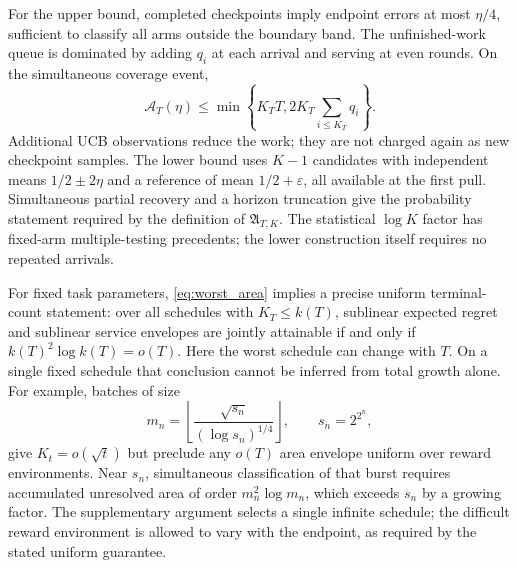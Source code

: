 For the upper bound, completed checkpoints imply endpoint errors at most
$\eta/4$, sufficient to classify all arms outside the boundary band. The
unfinished-work queue is dominated by adding $q_i$ at each arrival and serving
at even rounds. On the simultaneous coverage event,
\begin{equation}
 \mathcal A_T(\eta)\le\min\left\{K_TT,
                         2K_T\sum_{i\le K_T}q_i\right\}.
 \label{eq:queue_upper}
\end{equation}
Additional UCB observations reduce the work; they are not charged again as
new checkpoint samples. The lower bound uses $K-1$ candidates with independent
means $1/2\pm2\eta$ and a reference of mean $1/2+\varepsilon$, all available
at the first pull. Simultaneous partial recovery and a horizon truncation give
the probability statement required by the definition of $\mathfrak A_{T,K}$.
The statistical $\log K$ factor has fixed-arm multiple-testing precedents;
the lower construction itself requires no repeated arrivals.

For fixed task parameters, \eqref{eq:worst_area} implies a precise uniform
terminal-count statement: over all schedules with $K_T\le k(T)$, sublinear
expected regret and sublinear service envelopes are jointly attainable if and
only if $k(T)^2\log k(T)=o(T)$. Here the worst schedule can change with $T$.
On a single fixed schedule that conclusion cannot be inferred from total
growth alone. For example, batches of size
\[
 m_n=\left\lfloor\frac{\sqrt{s_n}}{(\log s_n)^{1/4}}\right\rfloor,
 \qquad s_n=2^{2^n},
\]
give $K_t=o(\sqrt t)$ but preclude any $o(T)$ area envelope uniform over
reward environments. Near $s_n$, simultaneous classification of that burst
requires accumulated unresolved area of order $m_n^2\log m_n$, which exceeds
$s_n$ by a growing factor. The supplementary argument selects a single
infinite schedule; the difficult reward environment is allowed to vary with
the endpoint, as required by the stated uniform guarantee.
